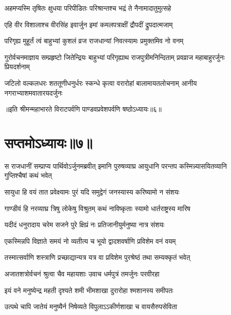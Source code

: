 \twolineshloka
{अहमप्यस्मि तृषितः क्षुधया परिपीडितः}
{परिश्रान्तश्च भद्रं ते नैनामादातुमुत्सहे}




\twolineshloka
{एहि वीर विशालाश्च वीरसिंह इवार्जुन}
{इमां कमलपत्राक्षीं द्रौपदीं द्रुपदात्मजाम्}


\twolineshloka
{परिगृह्य मुहूर्तं त्वं बाहुभ्यां कुशलं व्रज}
{राजधान्यां निवत्स्यामः प्रमुक्तमिव नो वनम्}



\threelineshloka
{गुरोर्वचनमाज्ञाय सम्प्रहृष्टो जितेन्द्रियः}
{बाहुभ्यां परिगृह्याथ राजपुत्रीमनिन्दिताम्}
{प्रवव्राज महाबाहुरर्जुनः प्रियदर्शनाम्}


\threelineshloka
{जटिलो वल्कलधरः शततूणीधनुर्धरः}
{स्कन्धे कृत्वा वरारोहां बालामायतलोचनाम्}
{आनीय नगराभ्याशमवातारयदर्जुनः}


॥इति श्रीमन्महाभारते विराटपर्वणि पाण्डवप्रवेशपर्वणि षष्ठोऽध्यायः॥६॥

\chapter{सप्तमोऽध्यायः॥७॥}

\threelineshloka
{स राजधानीं सम्प्राप्य पार्थिवोऽर्जुनमब्रवीत्}
{इमानि पुरुषव्याघ्र आयुधानि परन्तप}
{कस्मिन्न्यासयितव्यानि गुप्तिश्चैषां कथं भवेत्}


\twolineshloka
{सायुधा हि वयं तात प्रवेक्ष्यामः पुरं यदि}
{समुद्वेगं जनस्यास्य करिष्यामो न संशयः}


\twolineshloka
{गाण्डीवं हि नरव्याघ्र त्रिषु लोकेषु विश्रुतम्}
{कथं नाविष्कृताः स्यामो धार्तराष्ट्रस्य मारिष}


\twolineshloka
{यदीदं धनुरादाय चरेम सजने पुरे}
{क्षिप्रं नः प्रतिजानीयुर्मनुष्या नात्र संशयः}


\twolineshloka
{एकस्मिन्नपि विज्ञाते समयं नो व्यतीत्य च}
{भूयो द्वादशवर्षाणि प्रविशेम वनं वयम्}


\twolineshloka
{तस्मात्सर्वाणि शस्त्राणि प्रच्छाद्यान्यत्र यत्र वा}
{प्रविशेम पुरश्रेष्ठं तथा सम्यक्कृतं भवेत्}



\twolineshloka
{अजातशत्रोर्वचनं श्रुत्वा चैव महायशाः}
{उवाच धर्मपुत्रं तमर्जुनः परवीरहा}


\twolineshloka
{इयं वने मनुष्येन्द्र महती दृश्यते शमी}
{भीमशाखा दुरारोहा श्मशानस्य समीपतः}


\twolineshloka
{उत्पथे चापि जातेयं मनुष्यैर्न निषेव्यते}
{विपुलाऽऽकीर्णशाखा च वायसैरुपसेविता}


